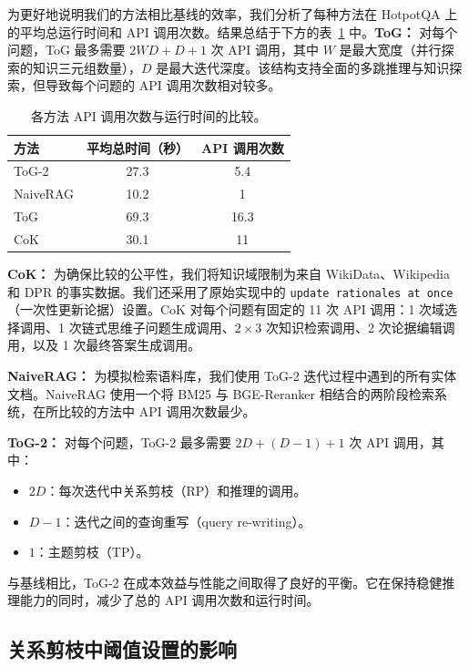 \documentclass[11pt,UTF8,fontset=fandol]{ctexart}
\newcommand{\toctwo}{ToG-2}
\begin{document}
为更好地说明我们的方法相比基线的效率，我们分析了每种方法在 HotpotQA 上的平均总运行时间和 API 调用次数。结果总结于下方的表~\ref{tab:9} 中。\textbf{ToG：} 对每个问题，ToG 最多需要 $2WD+D+1$ 次 API 调用，其中 $W$ 是最大宽度（并行探索的知识三元组数量），$D$ 是最大迭代深度。该结构支持全面的多跳推理与知识探索，但导致每个问题的 API 调用次数相对较多。

\begin{table}[H]\centering
\caption{各方法 API 调用次数与运行时间的比较。}
\begin{tabular}{lcc}
\toprule
方法 & 平均总时间（秒） & API 调用次数\\
\midrule
\toctwo{} & 27.3 & 5.4\\
NaiveRAG & 10.2 & 1\\
ToG & 69.3 & 16.3\\
CoK & 30.1 & 11\\
\bottomrule
\end{tabular}
\label{tab:9}
\end{table}

\noindent\textbf{CoK：} 为确保比较的公平性，我们将知识域限制为来自 WikiData、Wikipedia 和 DPR 的事实数据。我们还采用了原始实现中的 \texttt{update rationales at once}（一次性更新论据）设置。CoK 对每个问题有固定的 11 次 API 调用：1 次域选择调用、1 次链式思维子问题生成调用、$2\times 3$ 次知识检索调用、2 次论据编辑调用，以及 1 次最终答案生成调用。

\noindent\textbf{NaiveRAG：} 为模拟检索语料库，我们使用 \toctwo{} 迭代过程中遇到的所有实体文档。NaiveRAG 使用一个将 BM25 与 BGE-Reranker 相结合的两阶段检索系统，在所比较的方法中 API 调用次数最少。

\noindent\textbf{\toctwo{}：} 对每个问题，\toctwo{} 最多需要 $2D+(D-1)+1$ 次 API 调用，其中：
\begin{itemize}[leftmargin=2em]
\item $2D$：每次迭代中关系剪枝（RP）和推理的调用。
\item $D-1$：迭代之间的查询重写（query re-writing）。
\item $1$：主题剪枝（TP）。
\end{itemize}

与基线相比，\toctwo{} 在成本效益与性能之间取得了良好的平衡。它在保持稳健推理能力的同时，减少了总的 API 调用次数和运行时间。

\subsection{关系剪枝中阈值设置的影响}
\end{document}

